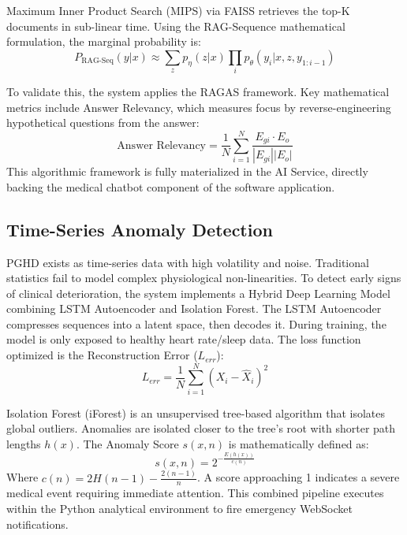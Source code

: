 \documentclass[journal, a4paper]{IEEEtran}
\begin{document}
Maximum Inner Product Search (MIPS) via FAISS retrieves the top-K documents in sub-linear time. Using the RAG-Sequence mathematical formulation, the marginal probability is:
\begin{equation}
P_{\text{RAG-Seq}}(y|x) \approx \sum_{z} p_{\eta}(z|x) \prod_{i} p_{\theta}(y_i|x, z, y_{1:i-1})
\end{equation}

To validate this, the system applies the RAGAS framework. Key mathematical metrics include Answer Relevancy, which measures focus by reverse-engineering hypothetical questions from the answer:
\begin{equation}
\text{Answer Relevancy} = \frac{1}{N} \sum_{i=1}^{N} \frac{E_{gi} \cdot E_o}{|E_{gi}| |E_o|}
\end{equation}
This algorithmic framework is fully materialized in the AI Service, directly backing the medical chatbot component of the software application.

\subsection{Time-Series Anomaly Detection}
PGHD exists as time-series data with high volatility and noise. Traditional statistics fail to model complex physiological non-linearities. To detect early signs of clinical deterioration, the system implements a Hybrid Deep Learning Model combining LSTM Autoencoder and Isolation Forest. The LSTM Autoencoder compresses sequences into a latent space, then decodes it. During training, the model is only exposed to healthy heart rate/sleep data. The loss function optimized is the Reconstruction Error ($L_{err}$):
\begin{equation}
L_{err} = \frac{1}{N} \sum_{i=1}^{N} (X_i - \hat{X}_i)^2
\end{equation}

Isolation Forest (iForest) is an unsupervised tree-based algorithm that isolates global outliers. Anomalies are isolated closer to the tree's root with shorter path lengths $h(x)$. The Anomaly Score $s(x,n)$ is mathematically defined as:
\begin{equation}
s(x,n) = 2^{-\frac{E(h(x))}{c(n)}}
\end{equation}
Where $c(n) = 2H(n-1) - \frac{2(n-1)}{n}$. A score approaching 1 indicates a severe medical event requiring immediate attention. This combined pipeline executes within the Python analytical environment to fire emergency WebSocket notifications.
\end{document}
